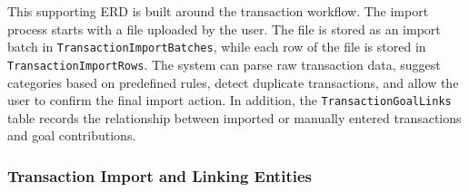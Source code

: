 ﻿\documentclass{article}
\begin{document}
This supporting ERD is built around the transaction workflow. The import process starts with a
file uploaded by the user. The file is stored as an import batch in
\texttt{TransactionImportBatches}, while each row of the file is stored in
\texttt{TransactionImportRows}. The system can parse raw transaction data, suggest categories
based on predefined rules, detect duplicate transactions, and allow the user to confirm the
final import action. In addition, the \texttt{TransactionGoalLinks} table records the
relationship between imported or manually entered transactions and goal contributions.

\subsubsection{Transaction Import and Linking Entities}
\end{document}
